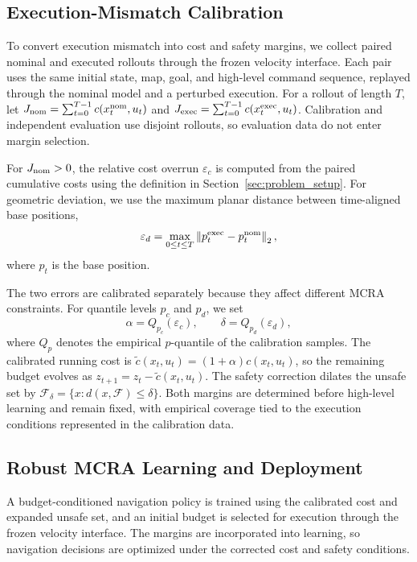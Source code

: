 \documentclass[conference]{IEEEtran}
\begin{document}
\subsection{Execution-Mismatch Calibration}
\label{sec:execution_calibration}
To convert execution mismatch into cost and safety margins, we collect paired
nominal and executed rollouts through the frozen velocity interface. Each pair
uses the same initial state, map, goal, and high-level command sequence, replayed
through the nominal model and a perturbed execution. For a rollout of length $T$,
let
$J_{\rm nom}=\sum_{t=0}^{T-1}c(x_t^{\rm nom},u_t)$ and
$J_{\rm exec}=\sum_{t=0}^{T-1}c(x_t^{\rm exec},u_t)$. Calibration and independent
evaluation use disjoint rollouts, so evaluation data do not enter margin selection.

For $J_{\rm nom}>0$, the relative cost overrun $\varepsilon_c$ is computed from
the paired cumulative costs using the definition in Section~\ref{sec:problem_setup}. For geometric
deviation, we use the maximum planar distance between time-aligned base
positions,
\begin{equation}
\varepsilon_d=\max_{0\leq t\leq T} \left\|p_t^{\rm exec}-p_t^{\rm nom}\right\|_2,
\end{equation}
where $p_t$ is the base position.

The two errors are calibrated separately because they affect different MCRA
constraints. For quantile levels $p_c$ and $p_d$, we set
\begin{equation}
\alpha=Q_{p_c}(\varepsilon_c),\qquad
\delta=Q_{p_d}(\varepsilon_d),
\end{equation}
where $Q_p$ denotes the empirical $p$-quantile of the calibration samples. The
calibrated running cost is
$\tilde c(x_t,u_t)=(1+\alpha)c(x_t,u_t)$, so the remaining budget evolves as
$z_{t+1}=z_t-\tilde c(x_t,u_t)$. The safety correction dilates the unsafe set by
$\mathcal{F}_\delta=\{x:d(x,\mathcal{F})\leq\delta\}$. Both margins are determined
before high-level learning and remain fixed, with empirical coverage tied to the
execution conditions represented in the calibration data.

\subsection{Robust MCRA Learning and Deployment}
A budget-conditioned navigation policy is trained using the calibrated cost and
expanded unsafe set, and an initial budget is selected for execution through the
frozen velocity interface. The margins are incorporated into learning, so navigation
decisions are optimized under the corrected cost and safety conditions.
\end{document}
